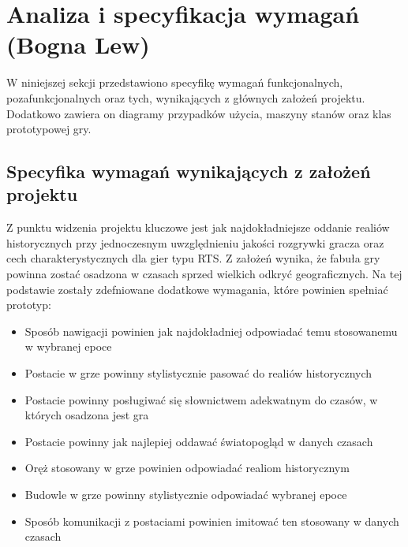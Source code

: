 \section{Analiza i specyfikacja wymagań (Bogna Lew)}
W niniejszej sekcji przedstawiono specyfikę wymagań funkcjonalnych, pozafunkcjonalnych oraz tych, wynikających z
głównych założeń projektu. Dodatkowo zawiera on diagramy przypadków użycia, maszyny stanów oraz klas prototypowej gry.

\subsection{Specyfika wymagań wynikających z założeń projektu}
Z punktu widzenia projektu kluczowe jest jak najdokładniejsze oddanie realiów historycznych przy jednoczesnym
uwzględnieniu jakości rozgrywki gracza oraz cech charakterystycznych dla gier typu RTS. Z założeń wynika, że fabuła
gry powinna zostać osadzona w czasach sprzed wielkich odkryć geograficznych. Na tej podstawie zostały zdefniowane
dodatkowe wymagania, które powinien spełniać prototyp:
\begin{itemize}
  \item Sposób nawigacji powinien jak najdokładniej odpowiadać temu stosowanemu w wybranej epoce
  \item Postacie w grze powinny stylistycznie pasować do realiów historycznych
  \item Postacie powinny posługiwać się słownictwem adekwatnym do czasów, w których osadzona jest gra
  \item Postacie powinny jak najlepiej oddawać światopogląd w danych czasach
  \item Oręż stosowany w grze powinien odpowiadać realiom historycznym
  \item Budowle w grze powinny stylistycznie odpowiadać wybranej epoce
  \item Sposób komunikacji z postaciami powinien imitować ten stosowany w danych czasach
\end{itemize}

